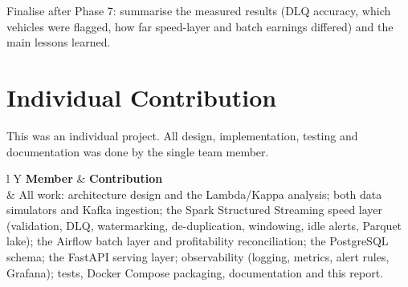 \documentclass[11pt,a4paper]{article}
\newcommand{\tocomplete}[1]{%
  \begin{tcolorbox}[colback=orange!6,colframe=orange!70!black,
    title=To complete (evidence from the running system),fonttitle=\bfseries\small,
    boxrule=0.6pt,arc=1mm]\small #1\end{tcolorbox}}
\begin{document}
\tocomplete{Finalise after Phase 7: summarise the measured results (DLQ accuracy, which vehicles
were flagged, how far speed-layer and batch earnings differed) and the main lessons learned.}

\section{Individual Contribution}

This was an individual project. All design, implementation, testing and documentation was done by
the single team member.

\begin{table}[H]
\centering\small
\begin{tabularx}{\linewidth}{l Y}
\toprule
\textbf{Member} & \textbf{Contribution} \\
\midrule
{} &
All work: architecture design and the Lambda/Kappa analysis; both data simulators and Kafka
ingestion; the Spark Structured Streaming speed layer (validation, DLQ, watermarking,
de-duplication, windowing, idle alerts, Parquet lake); the Airflow batch layer and profitability
reconciliation; the PostgreSQL schema; the FastAPI serving layer; observability (logging, metrics,
alert rules, Grafana); tests, Docker Compose packaging, documentation and this report. \\
\bottomrule
\end{tabularx}
\caption{Individual contribution.}
\end{table}
\end{document}
